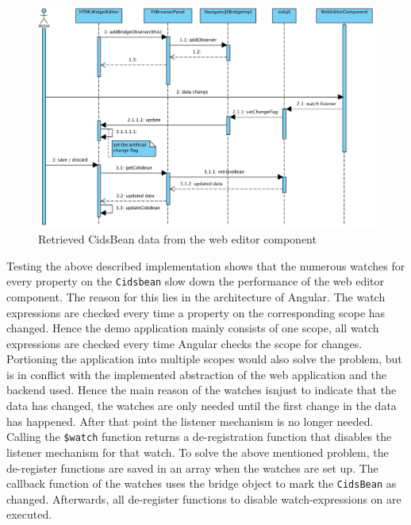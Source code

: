 \begin{figure}
	\centering	\includegraphics[width=1.0\textwidth]{./img/classDiagramms/seq_diag_data_exchange_2.png}
	\caption{Retrieved CidsBean data from the web editor component}
	\label{fig:seq-diag-data-exchange-2}
\end{figure}

Testing the above described implementation shows that the numerous watches for every property on the \texttt{Cidsbean} slow down the performance of the web editor component.
The reason for this lies in the architecture of Angular.
The watch expressions are checked every time a property on the corresponding scope has changed.
Hence the demo application mainly consists of one scope, all watch expressions are checked every time Angular checks the scope for changes.
Portioning the application into multiple scopes would also solve the problem, but is in conflict with the implemented abstraction of the web application and the backend used.
Hence the main reason of the watches isnjust  to indicate that the data has changed, the watches are only needed until the first change in the data has happened. 
After that point the listener mechanism is no longer needed. 
Calling the \texttt{\$watch} function returns a de-registration function that disables the listener mechanism for that watch.
To solve the above mentioned problem, the de-register functions are saved in an array when the watches are set up. The callback function of the watches uses the bridge object to mark the \texttt{CidsBean} as changed. Afterwards, all de-register functions to disable watch-expressions on  are executed. 


